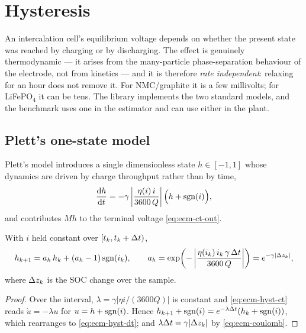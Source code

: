 \section{Hysteresis}
\label{sec:ecm-hyst}

An intercalation cell's equilibrium voltage depends on whether the present state was reached by
charging or by discharging. The effect is genuinely thermodynamic --- it arises from the
many-particle phase-separation behaviour of the electrode, not from kinetics
\cite{dreyer2010hysteresis} --- and it is therefore \emph{rate independent}: relaxing for an hour
does not remove it. For NMC/graphite it is a few millivolts; for LiFePO$_4$ it can be tens. The
library implements the two standard models, and the benchmark uses one in the estimator and can
use either in the plant.

\subsection{Plett's one-state model}
\label{sec:ecm-onestate}
Plett's model \cite{plett2004ekf1,plett2015bms1} introduces a single dimensionless state
$h\in[-1,1]$ whose dynamics are driven by charge throughput rather than by time,
\begin{equation}
\frac{\mathrm{d}h}{\mathrm{d}t} = -\gamma\left|\frac{\eta(i)\,i}{3600\,Q}\right|
 \Big(h + \operatorname{sgn}(i)\Big),
\label{eq:ecm-hyst-ct}
\end{equation}
and contributes $M h$ to the terminal voltage \eqref{eq:ecm-ct-out}.

\begin{proposition}\label{prop:ecm-hyst}
With $i$ held constant over $[t_k,t_k+\Delta t)$,
\begin{equation}
h_{k+1} = a_h\,h_k + (a_h - 1)\operatorname{sgn}(i_k), \qquad
a_h = \exp\!\left(-\left|\frac{\eta(i_k)\,i_k\,\gamma\,\Delta t}{3600\,Q}\right|\right)
    = e^{-\gamma|\Delta z_k|},
\label{eq:ecm-hyst-dt}
\end{equation}
where $\Delta z_k$ is the SOC change over the sample.
\end{proposition}
\begin{proof}
Over the interval, $\lambda = \gamma|\eta i/(3600Q)|$ is constant and \eqref{eq:ecm-hyst-ct}
reads $\dot{u} = -\lambda u$ for $u = h + \operatorname{sgn}(i)$. Hence
$h_{k+1} + \operatorname{sgn}(i) = e^{-\lambda\Delta t}(h_k + \operatorname{sgn}(i))$, which rearranges to
\eqref{eq:ecm-hyst-dt}; and $\lambda\Delta t = \gamma|\Delta z_k|$ by \eqref{eq:ecm-coulomb}.
\end{proof}

